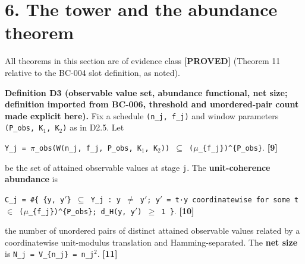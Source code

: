 \documentclass[
  american,
  11pt,
  letterpaper,
]{article}
\begin{document}
\section{6. The tower and the abundance theorem}\label{the-tower-and-the-abundance-theorem}

All theorems in this section are of evidence class \textbf{{[}PROVED{]}} (Theorem 11 relative to the BC-004 slot definition, as noted).

\textbf{Definition D3 (observable value set, abundance functional, net size; definition imported from BC-006, threshold and unordered-pair count made explicit here).} Fix a schedule \texttt{(n\_j,\ f\_j)} and window parameters \texttt{(P\_obs,\ K\ensuremath{{}_{1}},\ K\ensuremath{{}_{2}})} as in D2.5. Let

\texttt{Y\_j\ =\ \ensuremath{\pi}\_obs(W(n\_j,\ f\_j,\ P\_obs,\ K\ensuremath{{}_{1}},\ K\ensuremath{{}_{2}}))\ \ensuremath{\subseteq}\ (\ensuremath{\mu}\_\{f\_j\})\^{}\{P\_obs\}}. \textbf{{[}9{]}}

be the set of attained observable values at stage \texttt{j}. The \textbf{unit-coherence abundance} is

\texttt{C\_j\ =\ \#\{\ \{y,\ y\ensuremath{'}\}\ \ensuremath{\subseteq}\ Y\_j\ :\ y\ \ensuremath{\neq}\ y\ensuremath{'};\ y\ensuremath{'}\ =\ t·y\ coordinatewise\ for\ some\ t\ \ensuremath{\in}\ (\ensuremath{\mu}\_\{f\_j\})\^{}\{P\_obs\};\ d\_H(y,\ y\ensuremath{'})\ \ensuremath{\geq}\ 1\ \}}. \textbf{{[}10{]}}

the number of unordered pairs of distinct attained observable values related by a coordinatewise unit-modulus translation and Hamming-separated. The \textbf{net size} is \texttt{N\_j\ =\ \textbar{}V\_\{n\_j\}\textbar{}\ =\ n\_j\ensuremath{{}^{2}}}. \textbf{{[}11{]}}
\end{document}
